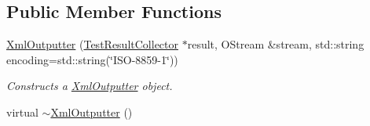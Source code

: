 \subsection*{Public Member Functions}
\begin{DoxyCompactItemize}
\item 
\hyperlink{class_xml_outputter_af98780d86b93b9eb2aa440c752d5ed6f}{Xml\-Outputter} (\hyperlink{class_test_result_collector}{Test\-Result\-Collector} $\ast$result, O\-Stream \&stream, std\-::string encoding=std\-::string(\char`\"{}I\-S\-O-\/8859-\/1\char`\"{}))
\begin{DoxyCompactList}\small\item\em Constructs a \hyperlink{class_xml_outputter}{Xml\-Outputter} object. \end{DoxyCompactList}\item 
\hypertarget{class_xml_outputter_a159ce827427e235d8f2db9719acbba94}{virtual \hyperlink{class_xml_outputter_a159ce827427e235d8f2db9719acbba94}{$\sim$\-Xml\-Outputter} ()}\label{class_xml_outputter_a159ce827427e235d8f2db9719acbba94}


\end{DoxyCompactItemize}
